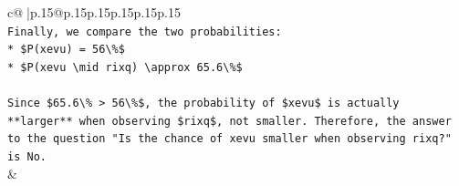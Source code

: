 \documentclass{article}
\begin{document}
{\begin{supertabular}{c@{$\;$}|p{.15\linewidth}@{}p{.15\linewidth}p{.15\linewidth}p{.15\linewidth}p{.15\linewidth}p{.15\linewidth}}
{{{\\ 
\texttt{Finally, we compare the two probabilities:} \\
\texttt{*   \$P(xevu) = 56\textbackslash{}\%\$} \\
\texttt{*   \$P(xevu \textbackslash{}mid rixq) \textbackslash{}approx 65.6\textbackslash{}\%\$} \\
\\ 
\texttt{Since \$65.6\textbackslash{}\% > 56\textbackslash{}\%\$, the probability of \$xevu\$ is actually **larger** when observing \$rixq\$, not smaller. Therefore, the answer to the question "Is the chance of xevu smaller when observing rixq?" is No.} \\
            }
        }
    }
    & \\ \\


\end{supertabular}}
\end{document}
